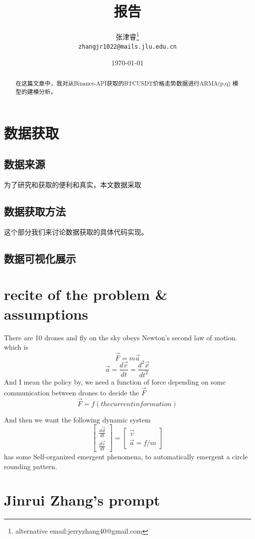 \documentclass{article}
\title{报告}
\author{
张津睿\thanks{alternative email:jerryzhang40@gmail.com} \\ \texttt{zhangjr1022@mails.jlu.edu.cn}
}
\date{\today}  %
\theoremstyle{definition} %
\begin{document}
\maketitle

\begin{abstract}
    在这篇文章中，我对从Binance-API获取的BTCUSDT价格走势数据进行ARMA(p,q)
    模型的建模分析。
\end{abstract}

\section{数据获取}
\subsection{数据来源}
为了研究和获取的便利和真实，本文数据采取
\subsection{数据获取方法}
这个部分我们来讨论数据获取的具体代码实现。
\subsection{数据可视化展示}

\section{recite of the problem \& assumptions}
There are 10 drones and fly on the sky
obeys Newton's second law of motion.
which is
\[
    \vec{F} = m \vec{a}
\]
\[
    \vec{a} = \frac{d\vec{v}}{dt} = \frac{d^2 \vec{x}}{dt^2}
\]
And I mean the policy by, we need a function of force
depending on some communication between drones
to decide the \(\vec{F}\)
\[
    \vec{F}=f(the current information)
\]

And then we want the following dynamic system
\[\begin{bmatrix}
        \frac{d\vec{d}}{dt} \\
        \frac{d\vec{v}}{dt}
    \end{bmatrix}=
    \begin{bmatrix}
        \vec{v} \\
        \vec{a}=f/m
    \end{bmatrix}
\]
has some Self-organized emergent phenomena,
to automatically emergent a circle rounding pattern.

\section{Jinrui Zhang's prompt}
\end{document}
